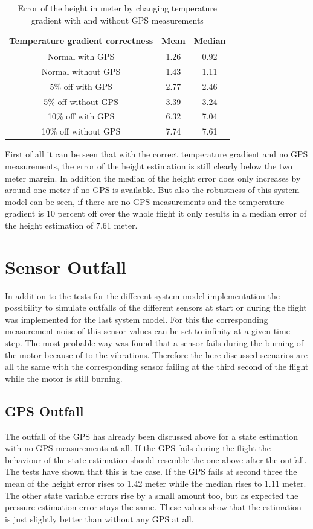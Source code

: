 \begin{table}[h!]
\centering
\begin{tabular}{ccc}
\hline
\multicolumn{1}{|c|}{Temperature gradient correctness} & \multicolumn{1}{|c|}{Mean}& \multicolumn{1}{|c|}{Median} \\ \hline
Normal with GPS 	& 1.26 		& 0.92\\
Normal without GPS	& 1.43	 	& 1.11\\
5\% off with GPS 	& 2.77	 	& 2.46\\
5\% off without GPS 	& 3.39	 	& 3.24\\
10\% off with GPS 	& 6.32	 	& 7.04\\
10\% off without GPS 	& 7.74 		& 7.61
\end{tabular}
\caption{Error of the height in meter by changing temperature gradient with and without GPS measurements}
\label{tab:ErrorChangingTempGradWithWithoutGPS}
\end{table}

First of all it can be seen that with the correct temperature gradient and no GPS measurements,
the error of the height estimation is still clearly below the two meter margin.
In addition the median of the height error does only increases by around one meter if no GPS is available.
But also the robustness of this system model can be seen, if there are no GPS measurements
and the temperature gradient is 10 percent off over the whole flight it only results in a median error of the height estimation of 7.61 meter.

\section{Sensor Outfall}
In addition to the tests for the different system model implementation
the possibility to simulate outfalls of the different sensors at start or during the flight was implemented for the last system model.
For this the corresponding measurement noise of this sensor values can be set to infinity at a given time step.
The most probable way was found that a sensor fails during the burning of the motor because of to the vibrations.
Therefore the here discussed scenarios are all the same with the corresponding sensor failing at the third second of the flight while the motor is still burning.

\subsection{GPS Outfall}
The outfall of the GPS has already been discussed above for a state estimation with no GPS measurements at all.
If the GPS fails during the flight the behaviour of the state estimation should resemble the one above after the outfall.
The tests have shown that this is the case.
If the GPS fails at second three the mean of the height error rises to 1.42 meter while the median rises to 1.11 meter.
The other state variable errors rise by a small amount too, but as expected the pressure estimation error stays the same.
These values show that the estimation is just slightly better than without any GPS at all.

